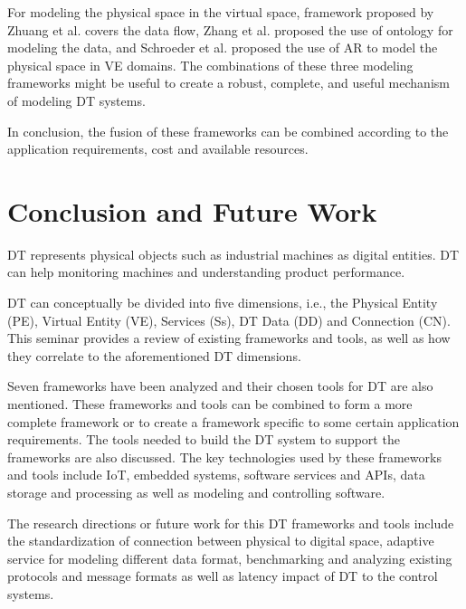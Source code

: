 \documentclass[article,table]{aaltoseries}
\begin{document}
For modeling the physical space in the virtual space, framework proposed by Zhuang et al. \cite{Zhuang2018} covers the data flow, Zhang et al. \cite{Zhang2017} proposed the use of ontology for modeling the data, and Schroeder et al. \cite{schroeder2016visualising} proposed the use of AR to model the physical space in VE domains. The combinations of these three modeling frameworks might be useful to create a robust, complete, and useful mechanism of modeling DT systems.

In conclusion, the fusion of these frameworks can be combined according to the application requirements, cost and available resources. 

\section{Conclusion and Future Work}
DT represents physical objects such as industrial machines as digital entities. DT can help monitoring machines and understanding product performance.

DT can conceptually be divided into five dimensions, i.e., the Physical Entity (PE), Virtual Entity (VE), Services (Ss), DT Data (DD) and Connection (CN). This seminar provides a review of existing frameworks and tools, as well as how they correlate to the aforementioned DT dimensions.

Seven frameworks have been analyzed and their chosen tools for DT are also mentioned. These frameworks and tools can be combined to form a more complete framework or to create a framework specific to some certain application requirements. The tools needed to build the DT system to support the frameworks are also discussed. The key technologies used by these frameworks and tools include IoT, embedded systems, software services and APIs, data storage and processing as well as modeling and controlling software.

The research directions or future work for this DT frameworks and tools include the standardization of connection between physical to digital space, adaptive service for modeling different data format, benchmarking and analyzing existing protocols and message formats as well as latency impact of DT to the control systems.

 




\end{document}
